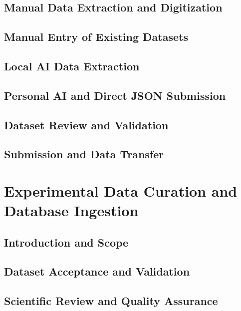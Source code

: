 \section{Manual Data Extraction and Digitization}

\section{Manual Entry of Existing Datasets}

\section{Local AI Data Extraction}

\section{Personal AI and Direct JSON Submission}

\section{Dataset Review and Validation}

\section{Submission and Data Transfer}


\chapter{Experimental Data Curation and Database Ingestion}
\label{chap:experimental-curation}

\section{Introduction and Scope}

\section{Dataset Acceptance and Validation}

\section{Scientific Review and Quality Assurance}

